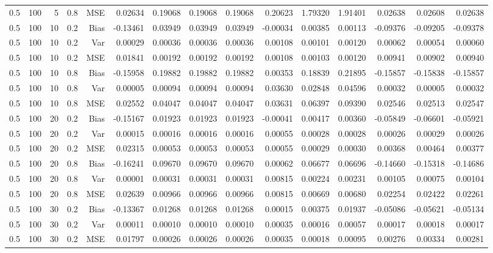 \begin{table}[!htbp]
\begin{tabular}{lrrrrrrrrrrrrrr}
0.5 & 100 &  5 & 0.8 & MSE & 0.02634 & 0.19068 & 0.19068 & 0.19068 & 0.20623 & 1.79320 & 1.91401 & 0.02638 & 0.02608 & 0.02638 \\
0.5 & 100 & 10 & 0.2 & Bias & -0.13461 & 0.03949 & 0.03949 & 0.03949 & -0.00034 & 0.00385 & 0.00113 & -0.09376 & -0.09205 & -0.09378 \\
0.5 & 100 & 10 & 0.2 & Var & 0.00029 & 0.00036 & 0.00036 & 0.00036 & 0.00108 & 0.00101 & 0.00120 & 0.00062 & 0.00054 & 0.00060 \\
0.5 & 100 & 10 & 0.2 & MSE & 0.01841 & 0.00192 & 0.00192 & 0.00192 & 0.00108 & 0.00103 & 0.00120 & 0.00941 & 0.00902 & 0.00940 \\
0.5 & 100 & 10 & 0.8 & Bias & -0.15958 & 0.19882 & 0.19882 & 0.19882 & 0.00353 & 0.18839 & 0.21895 & -0.15857 & -0.15838 & -0.15857 \\
0.5 & 100 & 10 & 0.8 & Var & 0.00005 & 0.00094 & 0.00094 & 0.00094 & 0.03630 & 0.02848 & 0.04596 & 0.00032 & 0.00005 & 0.00032 \\
0.5 & 100 & 10 & 0.8 & MSE & 0.02552 & 0.04047 & 0.04047 & 0.04047 & 0.03631 & 0.06397 & 0.09390 & 0.02546 & 0.02513 & 0.02547 \\
0.5 & 100 & 20 & 0.2 & Bias & -0.15167 & 0.01923 & 0.01923 & 0.01923 & -0.00041 & 0.00417 & 0.00360 & -0.05849 & -0.06601 & -0.05921 \\
0.5 & 100 & 20 & 0.2 & Var & 0.00015 & 0.00016 & 0.00016 & 0.00016 & 0.00055 & 0.00028 & 0.00028 & 0.00026 & 0.00029 & 0.00026 \\
0.5 & 100 & 20 & 0.2 & MSE & 0.02315 & 0.00053 & 0.00053 & 0.00053 & 0.00055 & 0.00029 & 0.00030 & 0.00368 & 0.00464 & 0.00377 \\
0.5 & 100 & 20 & 0.8 & Bias & -0.16241 & 0.09670 & 0.09670 & 0.09670 & 0.00062 & 0.06677 & 0.06696 & -0.14660 & -0.15318 & -0.14686 \\
0.5 & 100 & 20 & 0.8 & Var & 0.00001 & 0.00031 & 0.00031 & 0.00031 & 0.00815 & 0.00224 & 0.00231 & 0.00105 & 0.00075 & 0.00104 \\
0.5 & 100 & 20 & 0.8 & MSE & 0.02639 & 0.00966 & 0.00966 & 0.00966 & 0.00815 & 0.00669 & 0.00680 & 0.02254 & 0.02422 & 0.02261 \\
0.5 & 100 & 30 & 0.2 & Bias & -0.13367 & 0.01268 & 0.01268 & 0.01268 & 0.00015 & 0.00375 & 0.01937 & -0.05086 & -0.05621 & -0.05134 \\
0.5 & 100 & 30 & 0.2 & Var & 0.00011 & 0.00010 & 0.00010 & 0.00010 & 0.00035 & 0.00016 & 0.00057 & 0.00017 & 0.00018 & 0.00017 \\
0.5 & 100 & 30 & 0.2 & MSE & 0.01797 & 0.00026 & 0.00026 & 0.00026 & 0.00035 & 0.00018 & 0.00095 & 0.00276 & 0.00334 & 0.00281 \\

\end{tabular}
\end{table}
